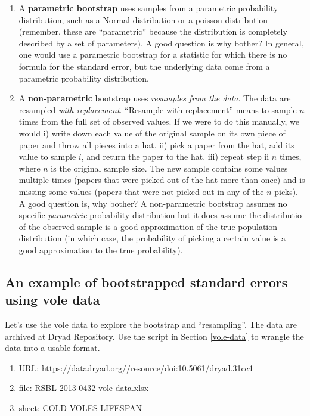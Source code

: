 \documentclass[]{book}
\providecommand{\tightlist}{%
  \setlength{\itemsep}{0pt}\setlength{\parskip}{0pt}}
\begin{document}
\begin{enumerate}
\def\labelenumi{\arabic{enumi}.}
\tightlist
\item
  A \textbf{parametric bootstrap} uses samples from a parametric probability distribution, such as a Normal distribution or a poisson distribution (remember, these are ``parametric'' because the distribution is completely described by a set of parameters). A good question is why bother? In general, one would use a parametric bootstrap for a statistic for which there is no formula for the standard error, but the underlying data come from a parametric probability distribution.
\item
  A \textbf{non-parametric} bootstrap uses \emph{resamples from the data}. The data are resampled \emph{with replacement}. ``Resample with replacement'' means to sample \(n\) times from the full set of observed values. If we were to do this manually, we would i) write down each value of the original sample on its own piece of paper and throw all pieces into a hat. ii) pick a paper from the hat, add its value to sample \(i\), and return the paper to the hat. iii) repeat step ii \(n\) times, where \(n\) is the original sample size. The new sample contains some values multiple times (papers that were picked out of the hat more than once) and is missing some values (papers that were not picked out in any of the \(n\) picks). A good question is, why bother? A non-parametric bootstrap assumes no specific \emph{parametric} probability distribution but it does assume the distributio of the observed sample is a good approximation of the true population distribution (in which case, the probability of picking a certain value is a good approximation to the true probability).
\end{enumerate}

\hypertarget{an-example-of-bootstrapped-standard-errors-using-vole-data}{%
\subsection{An example of bootstrapped standard errors using vole data}\label{an-example-of-bootstrapped-standard-errors-using-vole-data}}

Let's use the vole data to explore the bootstrap and ``resampling''. The data are archived at Dryad Repository. Use the script in Section \ref{vole-data} to wrangle the data into a usable format.

\begin{enumerate}
\def\labelenumi{\arabic{enumi}.}
\tightlist
\item
  URL: \url{https://datadryad.org//resource/doi:10.5061/dryad.31cc4}
\item
  file: RSBL-2013-0432 vole data.xlsx
\item
  sheet: COLD VOLES LIFESPAN
\end{enumerate}
\end{document}
